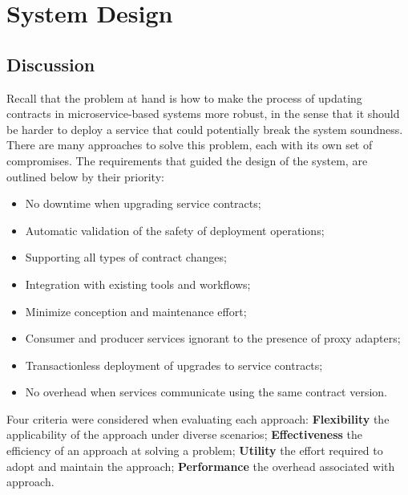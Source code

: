 
%

\chapter{System Design}
\label{cha:design}

\section{Discussion} %
\label{sec:discussion}

Recall that the problem at hand is how to make the process of updating contracts in
microservice-based systems more robust, in the sense that it should be harder to deploy a service that could
potentially break the system soundness.
There are many approaches to solve this problem, each with its own set of compromises.
The requirements that guided the design of the system, are outlined below by their priority:
\begin{itemize}
    \setlength\itemsep{0em}
    \item No downtime when upgrading service contracts;
    \item Automatic validation of the safety of deployment operations;
    \item Supporting all types of contract changes;
    \item Integration with existing tools and workflows;
    \item Minimize conception and maintenance effort;
    \item Consumer and producer services ignorant to the presence of proxy adapters;
    \item Transactionless deployment of upgrades to service contracts;
    \item No overhead when services communicate using the same contract version.
\end{itemize}

Four criteria were considered when evaluating each approach:
\textbf{Flexibility} the applicability of the approach under diverse scenarios;
\textbf{Effectiveness} the efficiency of an approach at solving a problem;
\textbf{Utility} the effort required to adopt and maintain the approach;
\textbf{Performance} the overhead associated with approach.

